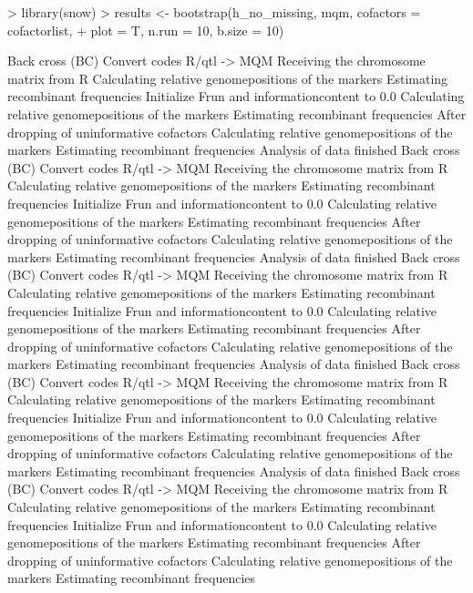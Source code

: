 \documentclass[a4paper]{article}
\begin{document}
\begin{Schunk}
\begin{Sinput}
> library(snow)
> results <- bootstrap(h_no_missing, mqm, cofactors = cofactorlist, 
+     plot = T, n.run = 10, b.size = 10)
\end{Sinput}
\begin{Soutput}
Back cross (BC)
Convert codes R/qtl -> MQM
Receiving the chromosome matrix from R
Calculating relative genomepositions of the markers
Estimating recombinant frequencies
Initialize Frun and informationcontent to 0.0
Calculating relative genomepositions of the markers
Estimating recombinant frequencies
After dropping of uninformative cofactors
Calculating relative genomepositions of the markers
Estimating recombinant frequencies
Analysis of data finished
Back cross (BC)
Convert codes R/qtl -> MQM
Receiving the chromosome matrix from R
Calculating relative genomepositions of the markers
Estimating recombinant frequencies
Initialize Frun and informationcontent to 0.0
Calculating relative genomepositions of the markers
Estimating recombinant frequencies
After dropping of uninformative cofactors
Calculating relative genomepositions of the markers
Estimating recombinant frequencies
Analysis of data finished
Back cross (BC)
Convert codes R/qtl -> MQM
Receiving the chromosome matrix from R
Calculating relative genomepositions of the markers
Estimating recombinant frequencies
Initialize Frun and informationcontent to 0.0
Calculating relative genomepositions of the markers
Estimating recombinant frequencies
After dropping of uninformative cofactors
Calculating relative genomepositions of the markers
Estimating recombinant frequencies
Analysis of data finished
Back cross (BC)
Convert codes R/qtl -> MQM
Receiving the chromosome matrix from R
Calculating relative genomepositions of the markers
Estimating recombinant frequencies
Initialize Frun and informationcontent to 0.0
Calculating relative genomepositions of the markers
Estimating recombinant frequencies
After dropping of uninformative cofactors
Calculating relative genomepositions of the markers
Estimating recombinant frequencies
Analysis of data finished
Back cross (BC)
Convert codes R/qtl -> MQM
Receiving the chromosome matrix from R
Calculating relative genomepositions of the markers
Estimating recombinant frequencies
Initialize Frun and informationcontent to 0.0
Calculating relative genomepositions of the markers
Estimating recombinant frequencies
After dropping of uninformative cofactors
Calculating relative genomepositions of the markers
Estimating recombinant frequencies

\end{Soutput}
\end{Schunk}
\end{document}
